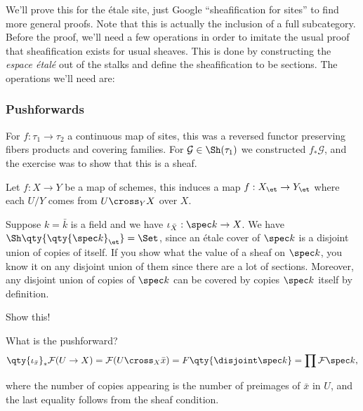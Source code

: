 We'll prove this for the étale site, just Google ``sheafification for
sites'' to find more general proofs. Note that this is actually the
inclusion of a full subcategory. Before the proof, we'll need a few
operations in order to imitate the usual proof that sheafification
exists for usual sheaves. This is done by constructing the \emph{espace
étalé} out of the stalks and define the sheafification to be sections.
The operations we'll need are:

\hypertarget{pushforwards}{%
\subsubsection{Pushforwards}\label{pushforwards}}

For \(f: \tau_1 \to \tau_2\) a continuous map of sites, this was a
reversed functor preserving fibers products and covering families. For
\(\mathcal{G}\in \Sh(\tau_1)\) we constructed \(f_* \mathcal{G}\), and
the exercise was to show that this is a sheaf.

\begin{example}[?]

Let \(f:X\to Y\) be a map of schemes, this induces a map
\(f: X_\et \to Y_\et\) where each \(U/Y\) comes from \(U\cross_Y X\)
over \(X\).

\end{example}

\begin{example}[?]

Suppose \(k=\bar k\) is a field and we have
\(\iota_{\bar X}:\spec k\to X\). We have
\(\Sh\qty{\qty{\spec k}_{\et}} = \Set\), since an étale cover of
\(\spec k\) is a disjoint union of copies of itself. If you show what
the value of a sheaf on \(\spec k\), you know it on any disjoint union
of them since there are a lot of sections. Moreover, any disjoint union
of copies of \(\spec k\) can be covered by copies \(\spec k\) itself by
definition.

\begin{exercise}[?]

Show this!

\end{exercise}

What is the pushforward?
\begin{align*}  
\qty{\iota_{\bar x}}_* \mathcal{F}(U\to X) = \mathcal{F}(U\cross_X \bar x)
= F\qty{\disjoint \spec k}
= \prod \mathcal{F}\spec k
,\end{align*}

where the number of copies appearing is the number of preimages of
\(\bar x\) in \(U\), and the last equality follows from the sheaf
condition.

\end{example}

